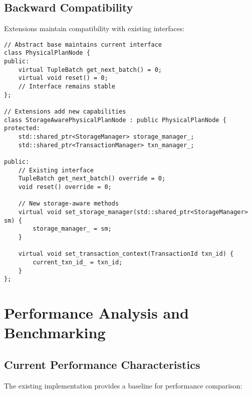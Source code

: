 \documentclass[12pt,a4paper]{article}
\begin{document}
    \subsection{Backward Compatibility}

    Extensions maintain compatibility with existing interfaces:

    \begin{lstlisting}[style=cpp, caption=Interface Compatibility Design]
// Abstract base maintains current interface
class PhysicalPlanNode {
public:
    virtual TupleBatch get_next_batch() = 0;
    virtual void reset() = 0;
    // Interface remains stable
};

// Extensions add new capabilities
class StorageAwarePhysicalPlanNode : public PhysicalPlanNode {
protected:
    std::shared_ptr<StorageManager> storage_manager_;
    std::shared_ptr<TransactionManager> txn_manager_;

public:
    // Existing interface
    TupleBatch get_next_batch() override = 0;
    void reset() override = 0;

    // New storage-aware methods
    virtual void set_storage_manager(std::shared_ptr<StorageManager> sm) {
        storage_manager_ = sm;
    }

    virtual void set_transaction_context(TransactionId txn_id) {
        current_txn_id_ = txn_id;
    }
};
    \end{lstlisting}

    \section{Performance Analysis and Benchmarking}

    \subsection{Current Performance Characteristics}

    The existing implementation provides a baseline for performance comparison:
\end{document}
